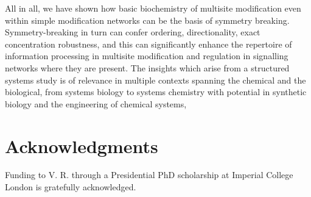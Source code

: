 \documentclass[9pt,lineno]{elife}
\begin{document}
 
 
 
 

All in all, we have shown how basic biochemistry of multisite modification even within simple modification networks can be the basis of symmetry breaking.
Symmetry-breaking in turn can confer ordering, directionality, exact concentration robustness, and this can  significantly enhance the repertoire of information processing in multisite modification and regulation in signalling networks where they are present.
The insights which arise from a structured systems study is of relevance in multiple contexts spanning the chemical and the biological, from systems biology to systems chemistry with potential in synthetic biology and the engineering of chemical systems, 



\section{Acknowledgments}

Funding to V. R. through a Presidential PhD scholarship at Imperial College London is gratefully acknowledged.
\end{document}
